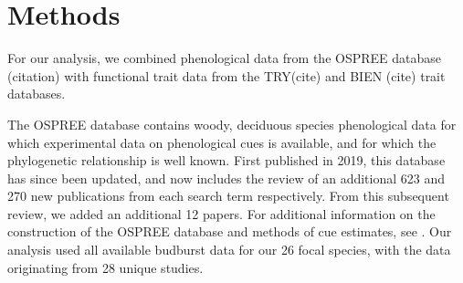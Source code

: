 \documentclass{article}\usepackage[]{graphicx}\usepackage[]{color}
\begin{document}


\section{Methods}
For our analysis, we combined phenological data from the OSPREE database (citation) with functional trait data from the TRY(cite) and BIEN (cite) trait databases. 

The OSPREE database contains woody, deciduous species phenological data for which experimental data on phenological cues is available, and for which the phylogenetic relationship is well known. First published in 2019, this database has since been updated, and now includes the review of an additional 623 and 270 new publications from each search term respectively. From this subsequent review, we added an additional 12 papers. For additional information on the construction of the OSPREE database and methods of cue estimates, see \citep{OSPREE}. Our analysis used all available budburst data for our 26 focal species, with the data originating from 28 unique studies. 
\end{document}

